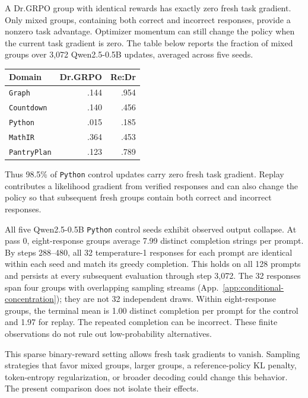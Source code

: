 A Dr.GRPO group with identical rewards has exactly zero fresh task gradient.
Only mixed groups, containing both correct and incorrect responses,
provide a nonzero task advantage. Optimizer momentum can still change the
policy when the current task gradient is zero. The table below reports
the fraction of mixed groups over 3,072 Qwen2.5-0.5B updates, averaged
across five seeds.

\begin{center}
\small
\begin{tabular}{@{}lrr@{}}
\toprule
\textbf{Domain} & \textbf{Dr.GRPO} & \textbf{Re:Dr} \\
\midrule
\texttt{Graph} & .144 & .954 \\
\texttt{Countdown} & .140 & .456 \\
\texttt{Python} & .015 & .185 \\
\texttt{MathIR} & .364 & .453 \\
\texttt{PantryPlan} & .123 & .789 \\
\bottomrule
\end{tabular}
\end{center}

Thus 98.5\% of \texttt{Python} control updates carry zero fresh task gradient.
Replay contributes a likelihood gradient from verified responses and can
also change the policy so that subsequent fresh groups contain both correct
and incorrect responses.

All five Qwen2.5-0.5B \texttt{Python} control seeds exhibit observed output collapse.
At pass 0, eight-response groups average 7.99 distinct completion strings
per prompt. By steps 288--480, all 32 temperature-1 responses for each
prompt are identical within each seed and match its greedy completion.
This holds on all 128 prompts and persists at every subsequent evaluation
through step 3,072. The 32 responses span four groups with overlapping sampling
streams (App.~\ref{app:conditional-concentration}); they are not 32 independent
draws. Within eight-response groups, the terminal mean is 1.00 distinct
completion per prompt for the control and 1.97 for replay. The repeated
completion can be incorrect. These finite observations do not rule out
low-probability alternatives.

This sparse binary-reward setting allows fresh task gradients to vanish.
Sampling strategies that favor mixed groups, larger groups, a reference-policy
KL penalty, token-entropy regularization, or broader decoding could change
this behavior. The present comparison does not isolate their effects.

